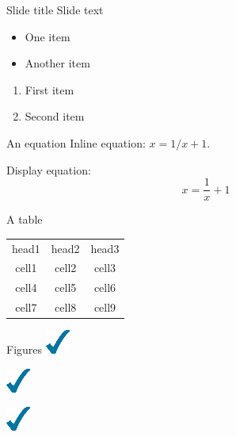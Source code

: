 \documentclass{beamer}
\begin{document}
\begin{frame}{Slide title}
Slide text
\begin{itemize}
  \item One item 
  \item Another item
\end{itemize}

\begin{enumerate}
  \item First item
  \item Second item
\end{enumerate}
\end{frame}

\begin{frame}{An equation}
Inline equation: $x = 1/x+1$.

Display equation:
\begin{equation}
  x = \frac{1}{x}+1
\end{equation}
\end{frame}

\begin{frame}{A table}
  \begin{tabular}{ c | c | c }
    head1 & head2 & head3 \\
    cell1 & cell2 & cell3 \\ 
    cell4 & cell5 & cell6 \\  
    cell7 & cell8 & cell9    
  \end{tabular}
\end{frame}

\begin{frame}{Figures}
  \includegraphics{bluecheck.png}
  
  \includegraphics{bluecheck.png}
  
  \includegraphics{bluecheck.png}
\end{frame}
\end{document}
